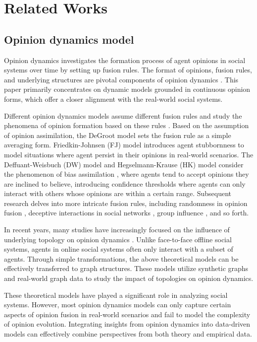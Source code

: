 \section{Related Works}
\subsection{Opinion dynamics model}

Opinion dynamics investigates the formation process of agent opinions in social systems over time by setting up fusion rules. The format of opinions, fusion rules, and underlying structures are pivotal components of opinion dynamics \cite{fusionsurvey}. This paper primarily concentrates on dynamic models grounded in continuous opinion forms, which offer a closer alignment with the real-world social systems\cite{boundedsurvey}.

Different opinion dynamics models assume different fusion rules and study the phenomena of opinion formation based on these rules \cite{sznajd}. Based on the assumption of opinion assimilation, the DeGroot model \cite{degroot} sets the fusion rule as a simple averaging form. Friedkin-Johnsen (FJ) model \cite{fj} introduces agent stubbornness to model situations where agent persist in their opinions in real-world scenarios. The Deffuant-Weisbuch (DW) \cite{dw} model and Hegselmann-Krause (HK) \cite{hk} model consider the phenomenon of bias assimilation \cite{frontiers}, where agents tend to accept opinions they are inclined to believe, introducing confidence thresholds where agents can only interact with others whose opinions are within a certain range. Subsequent research delves into more intricate fusion rules, including randomness in opinion fusion \cite{coevolving, hknoisy, asymptotic}, deceptive interactions in social networks \cite{deceptive}, group influence \cite{mepo}, and so forth.

In recent years, many studies have increasingly focused on the influence of underlying topology on opinion dynamics \cite{synchronization, altafini, fragility, community}. Unlike face-to-face offline social systems, agents in online social systems often only interact with a subset of agents. Through simple transformations, the above theoretical models can be effectively transferred to graph structures. These models utilize synthetic graphs and real-world graph data to study the impact of topologies on opinion dynamics.

These theoretical models have played a significant role in analyzing social systems. However, most opinion dynamics models can only capture certain aspects of opinion fusion in real-world scenarios and fail to model the complexity of opinion evolution. Integrating insights from opinion dynamics into data-driven models can effectively combine perspectives from both theory and empirical data.

